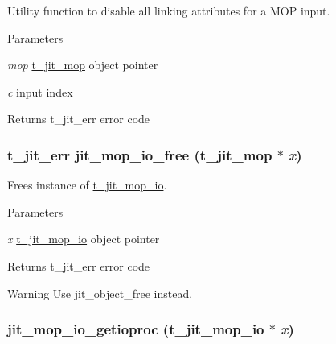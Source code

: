Utility function to disable all linking attributes for a MOP input. 
\begin{DoxyParams}{Parameters}
\item[{\em mop}]\hyperlink{structt__jit__mop}{t\_\-jit\_\-mop} object pointer \item[{\em c}]input index\end{DoxyParams}
\begin{DoxyReturn}{Returns}
t\_\-jit\_\-err error code 
\end{DoxyReturn}
\hypertarget{group__mopmod_gaad1c85a891e17b271edf23eac393d1f7}{
\subsubsection[{jit\_\-mop\_\-io\_\-free}]{\setlength{\rightskip}{0pt plus 5cm}t\_\-jit\_\-err jit\_\-mop\_\-io\_\-free ({\bf t\_\-jit\_\-mop} $\ast$ {\em x})}}
\label{group__mopmod_gaad1c85a891e17b271edf23eac393d1f7}


Frees instance of \hyperlink{structt__jit__mop__io}{t\_\-jit\_\-mop\_\-io}. 
\begin{DoxyParams}{Parameters}
\item[{\em x}]\hyperlink{structt__jit__mop__io}{t\_\-jit\_\-mop\_\-io} object pointer \end{DoxyParams}
\begin{DoxyReturn}{Returns}
t\_\-jit\_\-err error code
\end{DoxyReturn}
\begin{DoxyWarning}{Warning}
Use jit\_\-object\_\-free instead. 
\end{DoxyWarning}
\hypertarget{group__mopmod_gaad1d3da84eefe2cb691298be3800585f}{
\subsubsection[{jit\_\-mop\_\-io\_\-getioproc}]{ jit\_\-mop\_\-io\_\-getioproc ({\bf t\_\-jit\_\-mop\_\-io} $\ast$ {\em x})}}
\label{group__mopmod_gaad1d3da84eefe2cb691298be3800585f}


